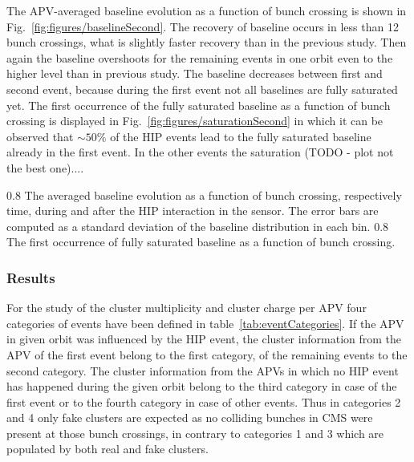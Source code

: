 The APV-averaged baseline evolution as a function of bunch crossing is shown in Fig.~\ref{fig:figures/baselineSecond}. The recovery of baseline occurs in less than 12 bunch crossings, what is slightly faster recovery than in the previous study. Then again the baseline overshoots for the remaining events in one orbit even to the higher level than in previous study. The baseline decreases between first and second event, because during the first event not all baselines are fully saturated yet. The first occurrence of the fully saturated baseline as a function of bunch crossing is displayed in Fig.~\ref{fig:figures/saturationSecond} in which it can be observed that $\sim 50\%$ of the HIP events lead to the fully saturated baseline already in the first event. In the other events the saturation (TODO - plot not the best one)....

                 {0.8}       %
                 {The averaged baseline evolution as a function of bunch crossing, respectively time, during and after the HIP interaction in the sensor. The error bars are computed as a standard deviation of the baseline distribution in each bin.  } %
                 {0.8}       %
                 { The first occurrence of fully saturated baseline as a function of bunch crossing. } %
 
\subsubsection{Results}

For the study of the cluster multiplicity and cluster charge per APV four categories of events have been defined in table~\ref{tab:eventCategories}. If the APV in given orbit was influenced by the HIP event, the cluster information from the APV of the first event belong to the first category, of the remaining events to the second category. The cluster information from the APVs in which no HIP event has happened during the given orbit belong to the third category in case of the first event or to the fourth category in case of other events. Thus in categories 2 and 4 only fake clusters are expected as no colliding bunches in CMS were present at those bunch crossings, in contrary to categories 1 and 3 which are populated by both real and fake clusters.

